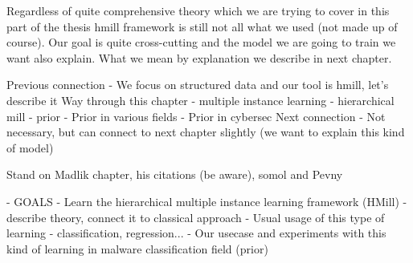 Regardless of quite comprehensive theory which we are trying to cover in this part of the thesis hmill framework is still not all what we used (not made up of course). Our goal is quite cross-cutting and the model we are going to train we want also explain. What we mean by explanation we describe in next chapter.




Previous connection
- We focus on structured data and our tool is hmill, let's describe it
Way through this chapter
- multiple instance learning
- hierarchical mill
- prior
    - Prior in various fields
    - Prior in cybersec
Next connection
- Not necessary, but can connect to next chapter slightly (we want to explain this kind of model)

Stand on Madlik chapter, his citations (be aware), somol and Pevny


- GOALS 
- Learn the hierarchical multiple instance learning framework (HMill)
- describe theory, connect it to classical approach
- Usual usage of this type of learning - classification, regression...
- Our usecase and experiments with this kind of learning in malware classification field (prior)
